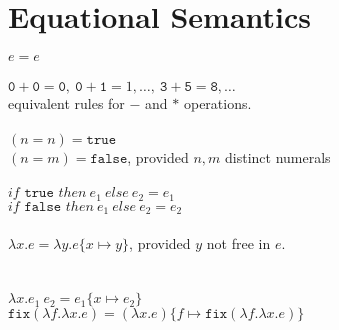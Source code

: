 \documentclass{westhesis}
\begin{document}
\section{Equational Semantics}
$e = e$ \\ \\
$\texttt{0} + \texttt{0} = \texttt{0}, \ \texttt{0} + \texttt{1} = 1, \ldots, \ \texttt{3} + \texttt{5} = \texttt{8}, \ldots$  \\
equivalent rules for $-$ and $*$ operations.
\\ \\
$(n =n) = \texttt{true}$ \\ $(n=m) = \texttt{false}$, provided $n, m$ distinct numerals \\ \\ 
$if \texttt{ true } then \ e_1 \ else \ e_2 = e_1$ \\
$if \texttt{ false } then \ e_1 \ else \ e_2 = e_2$ \\ \\ 
$\lambda x.e = \lambda y.e\{x \mapsto y \}$, provided $y$ not free in $e$. \\ \\ \\
$\lambda x.e_1 \ e_2 = e_1\{x \mapsto e_2\}$ \\
$\texttt{fix}(\lambda f. \lambda x.e) = (\lambda x.e)\{f \mapsto \texttt{fix}(\lambda f.\lambda x.e)\}$
\end{document}
